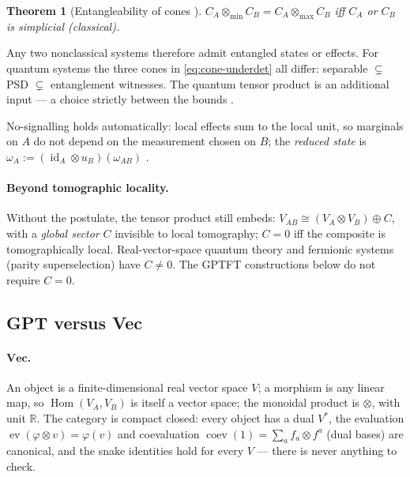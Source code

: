 \documentclass[prl,aps,10pt,superscriptaddress, floatfix]{revtex4-2}
\newtheorem{theo}{Theorem}
\begin{document}
\begin{theo}[Entangleability of cones \cite{ALPP2021}]\label{theo:alpp}
$C_A\otimes_{\min}C_B=C_A\otimes_{\max}C_B$ iff $C_A$ or $C_B$ is simplicial (classical).
\end{theo}

Any two nonclassical systems therefore admit entangled states or effects. For quantum systems the three cones in \eqref{eq:cone-underdet} all differ: separable $\subsetneq$ PSD $\subsetneq$ entanglement witnesses. The quantum tensor product is an additional input --- a choice strictly between the bounds \cite{Mueller2021}.

No-signalling holds automatically: local effects sum to the local unit, so marginals on $A$ do not depend on the measurement chosen on $B$; the \emph{reduced state} is $\omega_A:=(\operatorname{id}_A\otimes u_B)(\omega_{AB})$ \cite{Mueller2021}.

\paragraph{Beyond tomographic locality.}
Without the postulate, the tensor product still embeds: $V_{AB}\cong(V_A\otimes V_B)\oplus C$, with a \emph{global sector} $C$ invisible to local tomography; $C=0$ iff the composite is tomographically local. Real-vector-space quantum theory \cite{HardyWootters2012} and fermionic systems (parity superselection) have $C\neq0$. The GPTFT constructions below do not require $C=0$.

\subsection{GPT versus Vec}

\paragraph{$\mathbf{Vec}$.}
An object is a finite-dimensional real vector space $V$; a morphism is any linear map, so $\operatorname{Hom}(V_A,V_B)$ is itself a vector space; the monoidal product is $\otimes$, with unit $\mathbb{R}$. The category is compact closed: every object has a dual $V^*$, the evaluation $\operatorname{ev}(\varphi\otimes v)=\varphi(v)$ and coevaluation $\operatorname{coev}(1)=\sum_af_a\otimes f^a$ (dual bases) are canonical, and the snake identities hold for every $V$ --- there is never anything to check.
\end{document}
